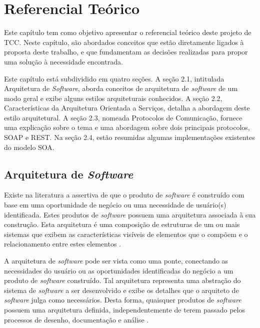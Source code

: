 \chapter[Referencial Teórico]{Referencial Teórico}

Este capítulo tem como objetivo apresentar o referencial teórico deste projeto de TCC. Neste capítulo, são abordados conceitos que estão diretamente ligados à proposta deste trabalho, e que fundamentam as decisões realizadas para propor uma solução à necessidade encontrada.

Este capítulo está subdividido em quatro seções. A seção 2.1, intitulada Arquitetura de \textit{Software}, aborda conceitos de arquitetura de \textit{software} de um modo geral e exibe alguns estilos arquiteturais conhecidos. A seção 2.2, Características da Arquitetura Orientada a Serviços, detalha a abordagem deste estilo arquitetural. A seção 2.3, nomeada Protocolos de Comunicação, fornece uma explicação sobre o tema e uma abordagem sobre dois principais protocolos, SOAP e REST. Na seção 2.4, estão resumidas algumas implementações existentes do modelo SOA.

\section{Arquitetura de \textit{Software}}
Existe na literatura a assertiva de que o produto de \textit{software} é construído com base em uma oportunidade de negócio ou uma necessidade de usuário(s) identificada. Estes produtos de \textit{software} possuem uma arquitetura associada à sua construção. Esta arquitetura é uma composição de estruturas de um ou mais sistemas que exibem as características visíveis de elementos que o compõem e o relacionamento entre estes elementos \cite{bass_software_archi_practice_2003}.

A arquitetura de \textit{software} pode ser vista como uma ponte, conectando as necessidades do usuário ou as oportunidades identificadas do negócio a um produto de \textit{software} construído. Tal arquitetura representa uma abstração do sistema de \textit{software} a ser desenvolvido e exibe os detalhes que o arquiteto de \textit{software} julga como necessários. Desta forma, quaisquer produtos de \textit{software} possuem uma arquitetura definida, independentemente de terem passado pelos processos de desenho, documentação e análise \cite{bass_software_archi_practice_2003}.

